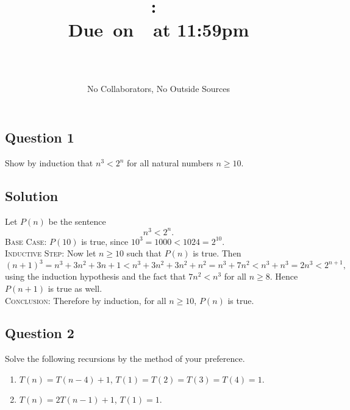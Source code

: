 \documentclass{article}
\title{
    \vspace{2in}
    \textbf{\hmwkClass:\ \hmwkTitle}\\
    \normalsize\vspace{0.1in}\small{Due\ on\ \hmwkDueDate\ at 11:59pm}\\
    \vspace{0.1in}\large{\textit{\hmwkClassInstructor}}
    \vspace{3in}
    \author{\textbf{\hmwkAuthorName} \\ \\ \small No Collaborators, No Outside Sources}
    \date{}
}
\begin{document}
\maketitle
\pagebreak

\subsection*{Question 1}
    Show by induction that $n^{3} < 2^{n}$ for all natural numbers $n \ge 10$.
    
\subsection*{Solution}
    Let $P(n)$ be the sentence $$n^{3} < 2^{n}.$$
    \textsc{Base Case}:  $P(10)$ is true, since $10^{3} = 1000 < 1024 = 2^{10}$. \\
    \textsc{Inductive Step}: Now let $n \ge 10$ such that $P(n)$ is true. Then $$(n + 1)^{3} = n^{3} + 3n^{2} + 3n + 1 < n^{3} + 3n^{2} + 3n^{2} + n^{2} = n^{3} + 7n^{2} < n^{3} + n^{3} = 2n^{3} < 2^{n + 1},$$ using the induction hypothesis and the fact that $7n^{2} < n^{3}$ for all $n \ge 8$. Hence $P(n + 1)$ is true as well. \\
    \textsc{Conclusion}: Therefore by induction, for all $n \ge 10$, $P(n)$ is true.

\subsection*{Question 2}
    Solve the following recursions by the method of your preference.
    \begin{enumerate}
        \item $T(n) = T(n - 4) + 1$, $T(1) = T(2) = T(3) = T(4) = 1$.
        \item $T(n) = 2T(n - 1) + 1$, $T(1) = 1$.
    \end{enumerate}
\end{document}
